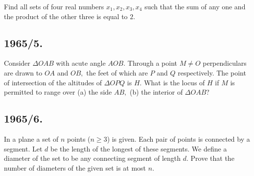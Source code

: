 \documentclass[12pt,thmsa]{article}
\begin{document}
Find all sets of four real numbers  $x_{1},x_{2},x_{3},x_{4}$ such that the
sum of any one and the product of the other three is equal to $2.$

\subsection{1965/5.}

Consider $\Delta OAB$ with acute angle $AOB.$ Through a point $M\neq O$
perpendiculars are drawn to $OA$ and $OB,$ the feet of which are $P$ and $Q$
respectively. The point of intersection of the altitudes of $\Delta OPQ$ is $%
H.$ What is the locus of $H$ if $M$ is permitted to range over (a) the side $%
AB,$ (b) the interior of $\Delta OAB$?

\subsection{1965/6.}

In a plane a set of $n$ points ($n\geq 3$) is given. Each pair of points is
connected by a segment. Let $d$ be the length of the longest of these
segments. We define a diameter of the set to be any connecting segment of
length $d.$ Prove that the number of diameters of the given set is at most $%
n.$
\end{document}
